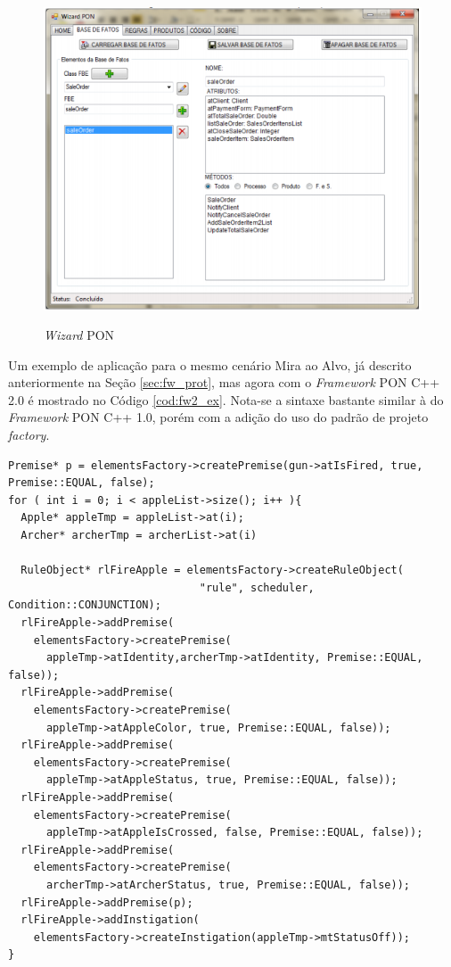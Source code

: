 \begin{figure}[!htb]
  \centering
  \caption{\textit{Wizard} PON} \includegraphics[width=.9\textwidth]{../figures/wizard.png}
  \label{fig:wizard}
\end{figure}

Um exemplo de aplicação para o mesmo cenário Mira ao Alvo, já descrito
anteriormente na Seção \ref{sec:fw_prot}, mas agora com o \textit{Framework} PON
C++ 2.0 é mostrado no Código \ref{cod:fw2_ex}. Nota-se a sintaxe bastante
similar à do \textit{Framework} PON C++ 1.0, porém com a adição do uso do padrão
de projeto \textit{factory}. 

\begin{lstlisting}[caption = {Exemplo de programa com o \textit{framework} C++ 2.0},
source = {Adaptado de \citeonline{msc_valenca_2012}},
  label = {cod:fw2_ex}, float=htb]
Premise* p = elementsFactory->createPremise(gun->atIsFired, true, Premise::EQUAL, false);
for ( int i = 0; i < appleList->size(); i++ ){
  Apple* appleTmp = appleList->at(i);
  Archer* archerTmp = archerList->at(i)

  RuleObject* rlFireApple = elementsFactory->createRuleObject(
                              "rule", scheduler, Condition::CONJUNCTION);
  rlFireApple->addPremise(
    elementsFactory->createPremise(
      appleTmp->atIdentity,archerTmp->atIdentity, Premise::EQUAL, false));
  rlFireApple->addPremise(
    elementsFactory->createPremise(
      appleTmp->atAppleColor, true, Premise::EQUAL, false));
  rlFireApple->addPremise(
    elementsFactory->createPremise(
      appleTmp->atAppleStatus, true, Premise::EQUAL, false));
  rlFireApple->addPremise(
    elementsFactory->createPremise(
      appleTmp->atAppleIsCrossed, false, Premise::EQUAL, false));
  rlFireApple->addPremise(
    elementsFactory->createPremise(
      archerTmp->atArcherStatus, true, Premise::EQUAL, false));
  rlFireApple->addPremise(p);
  rlFireApple->addInstigation(
    elementsFactory->createInstigation(appleTmp->mtStatusOff));
}
\end{lstlisting}

